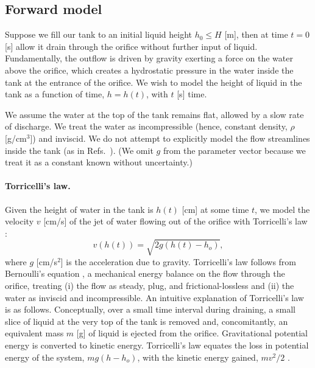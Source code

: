 \documentclass[openacc]{rsproca_new}%
\begin{document}
\subsection{Forward model}
Suppose we fill our tank to an initial liquid height $h_0 \leq H$ [m], then at time $t=0$ [s] allow it drain through the orifice without further input of liquid. Fundamentally, the outflow is driven by gravity exerting a force on the water above the orifice, which creates a hydrostatic pressure in the water inside the tank at the entrance of the orifice. 
We wish to model the height of liquid in the tank as a function of time, $h=h(t)$, with $t$ [s] time. 

We assume the water at the top of the tank remains flat, allowed by a slow rate of discharge. We treat the water as incompressible (hence, constant density, $\rho$ [g/cm$^3$]) and inviscid. We do not attempt to explicitly model the flow streamlines inside the tank (as in Refs.~\cite{mathew2014numerical,sakri2017numerical}). (We omit $g$ from the parameter vector because we treat it as a constant known without uncertainty.)

\paragraph{Torricelli's law.}
Given the height of water in the tank is $h(t)$ [cm] at some time $t$, we model the velocity $v$ [cm/s] of the jet of water flowing out of the orifice with Torricelli's law \cite{d2021torricelli}:
\begin{equation}
	v\left(h(t) \right)=  \sqrt{2 g(h(t)-h_o)}, \label{eq:Torricelli}
\end{equation} where $g$ [cm/s$^2$] is the acceleration due to gravity. Torricelli's law follows from Bernoulli's equation \cite{welty2020fundamentals}, a mechanical energy balance on the flow through the orifice, treating (i) the flow as steady, plug, and frictional-lossless and (ii) the water as inviscid and incompressible.
An intuitive explanation of Torricelli's law is as follows. 
Conceptually, over a small time interval during draining, a small slice of liquid at the very top of the tank is removed and, concomitantly, an equivalent mass $m$ [g] of liquid is ejected from the orifice.
Gravitational potential energy is converted to kinetic energy. 
Torricelli's law equates the loss in potential energy of the system, $m g(h-h_o)$, with the kinetic energy gained, $m v^2/2$ \cite{groetsch1993inverse,driver1998torricelli,williams2021vessel}. 
\end{document}
